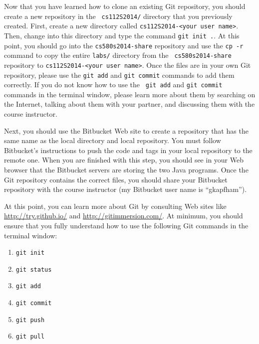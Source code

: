 Now that you have learned how to clone an existing Git repository, you should create a new repository in the {\tt
cs112S2014/} directory that you previously created.  First, create a new directory called {\tt cs112S2014-<your user
name>}. Then, change into this directory and type the command {\tt git init .}.  At this point, you should go into the
{\tt cs580s2014-share} repository and use the {\tt cp -r} command to copy the entire {\tt labs/} directory from the {\tt
cs580s2014-share} repository to {\tt cs112S2014-<your user name>}.  Once the files are in your own Git repository,
please use the {\tt git add} and {\tt git commit} commands to add them correctly. If you do not know how to use the {\tt
git add} and {\tt git commit} commands in the terminal window, please learn more about them by searching on the
Internet, talking about them with your partner, and discussing them with the course instructor.

Next, you should use the Bitbucket Web site to create a repository that has the same name as the local directory and
local repository.  You must follow Bitbucket's instructions to push the code and tags in your local repository to the
remote one. When you are finished with this step, you should see in your Web browser that the Bitbucket servers are
storing the two Java programs. Once the Git repository contains the correct files, you should share your Bitbucket
repository with the course instructor (my Bitbucket user name is ``gkapfham'').

At this point, you can learn more about Git by consulting Web sites like \url{http://try.github.io/} and
\url{http://gitimmersion.com/}.  At minimum, you should ensure that you fully understand how to use the following Git
commands in the terminal window:

\begin{enumerate} 
			
	\item {\tt git init}

	\item {\tt git status}

	\item {\tt git add} 

	\item {\tt git commit}

	\item {\tt git push}

	\item {\tt git pull} 

\end{enumerate}

